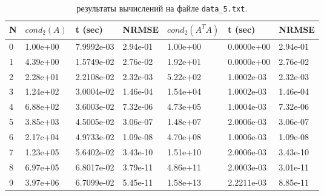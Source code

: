 \documentclass{article}
\begin{document}
\begin{table}[h!]
\begin{tabular}{|l||l|l|l||l|l|l|}
\hline
N & $cond_2(A)$ & t (sec)    & NRMSE    & $cond_2(A^TA)$ & t (sec)    & NRMSE    \\ \hline
0 & 1.00e+00   & 7.9992e-03 & 2.94e-01 & 1.00e+00                       & 0.0000e+00 & 2.94e-01 \\ \hline
1 & 4.39e+00   & 1.5749e-02 & 2.76e-02 & 1.92e+01                       & 0.0000e+00 & 2.76e-02 \\ \hline
2 & 2.28e+01   & 2.2108e-02 & 2.32e-03 & 5.22e+02                       & 1.0002e-03 & 2.32e-03 \\ \hline
3 & 1.24e+02   & 3.0004e-02 & 1.46e-04 & 1.54e+04                       & 1.0002e-03 & 1.46e-04 \\ \hline
4 & 6.88e+02   & 3.6003e-02 & 7.32e-06 & 4.73e+05                       & 1.0004e-03 & 7.32e-06 \\ \hline
5 & 3.85e+03   & 4.5005e-02 & 3.06e-07 & 1.48e+07                       & 2.0006e-03 & 3.06e-07 \\ \hline
6 & 2.17e+04   & 4.9733e-02 & 1.09e-08 & 4.70e+08                       & 1.0006e-03 & 1.09e-08 \\ \hline
7 & 1.23e+05   & 5.6402e-02 & 3.43e-10 & 1.51e+10                       & 2.0006e-03 & 3.43e-10 \\ \hline
8 & 6.97e+05   & 6.8017e-02 & 3.79e-11 & 4.86e+11                       & 2.0003e-03 & 3.01e-11 \\ \hline
9 & 3.97e+06   & 6.7099e-02 & 5.45e-11 & 1.58e+13                       & 2.2211e-03 & 8.85e-11 \\ \hline
\end{tabular}
\caption{результаты вычислений на файле \texttt{data\_5.txt}.}
\end{table}
\end{document}
